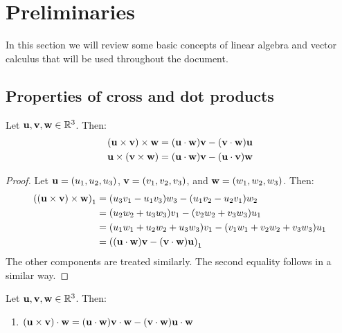 \documentclass[../main.tex]{subfiles}
\begin{document}
\section{Preliminaries}\label{sec:preliminaries}
In this section we will review some basic concepts of linear algebra and vector calculus that will be used throughout the document.
\subsection{Properties of cross and dot products}
\begin{proposition}
  \label{prop:triplecross}
  Let $\vf{u}, \vf{v}, \vf{w}\in\RR^3$. Then:
  \begin{align}
    (\vf{u}\times\vf{v})\times\vf{w} & =(\vf{u}\cdot\vf{w})\vf{v}-(\vf{v}\cdot\vf{w})\vf{u} \\
    \vf{u}\times(\vf{v}\times\vf{w}) & =(\vf{u}\cdot\vf{w})\vf{v}-(\vf{u}\cdot\vf{v})\vf{w}
  \end{align}
\end{proposition}
\begin{proof}
  Let $\vf{u}=(u_1,u_2,u_3)$, $\vf{v}=(v_1,v_2,v_3)$, and $\vf{w}=(w_1,w_2,w_3)$. Then:
  \begin{align*}
    {((\vf{u}\times\vf{v})\times\vf{w})}_1 & =(u_3v_1-u_1v_3)w_3-(u_1v_2-u_2v_1)w_2                     \\
                                           & =(u_2w_2+u_3w_3)v_1-(v_2w_2+v_3w_3)u_1                     \\
                                           & =(u_1w_1+u_2w_2+u_3w_3)v_1-(v_1w_1+v_2w_2+v_3w_3)u_1       \\
                                           & ={((\vf{u}\cdot\vf{w})\vf{v}-(\vf{v}\cdot\vf{w})\vf{u})}_1
  \end{align*}
  The other components are treated similarly. The second equality follows in a similar way.
\end{proof}
\begin{proposition}
  Let $\vf{u}, \vf{v}, \vf{w}\in\RR^3$. Then:
  \begin{enumerate}
    \item $(\vf{u}\times\vf{v})\cdot\vf{w}=(\vf{u}\cdot\vf{w})\vf{v}\cdot\vf{w}-(\vf{v}\cdot\vf{w})\vf{u}\cdot\vf{w}$
  \end{enumerate}
\end{proposition}
\end{document}

